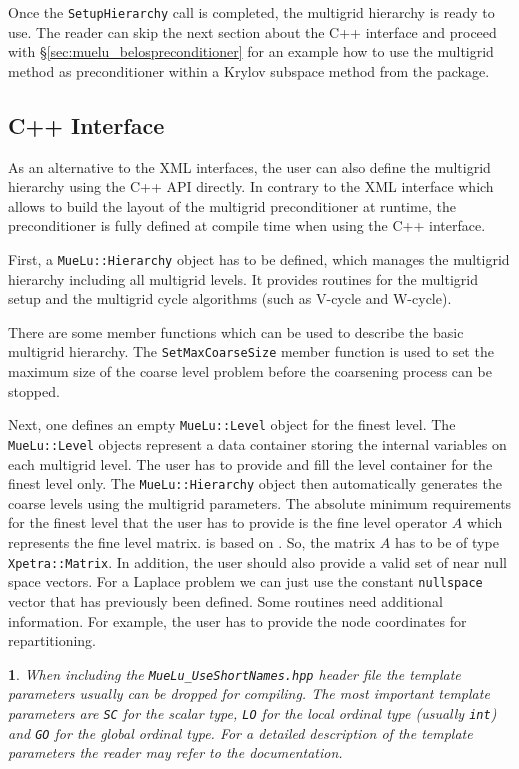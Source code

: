 \documentclass[10pt,fleqn]{book}
\newtheorem*{mycomment}{\ding{42}}
\providecommand\printCppListing[1]{

}
\begin{document}
Once the \texttt{SetupHierarchy} call is completed, the multigrid hierarchy is ready to use. The reader can skip the next section about the C++ interface and proceed with \S\ref{sec:muelu_belospreconditioner} for an example how to use the multigrid method as preconditioner within a Krylov subspace method from the \belos package.

\subsection{C++ Interface}

As an alternative to the XML interfaces, the user can also define the multigrid hierarchy using the C++ API directly. In contrary to the XML interface which allows to build the layout of the multigrid preconditioner at runtime, the preconditioner is fully defined at compile time when using the C++ interface.

First, a \texttt{MueLu::Hierarchy} object has to be defined, which manages the multigrid hierarchy including all multigrid levels. It provides routines for the multigrid setup and the multigrid cycle algorithms (such as V-cycle and W-cycle).
\printCppListing{ScalingTest.cpp_6.fragment}

There are some member functions which can be used to describe the basic multigrid hierarchy. The \texttt{SetMaxCoarseSize} member function is used to set the maximum size of the coarse level problem before the coarsening process can be stopped.
\printCppListing{ScalingTest.cpp_8.fragment}

Next, one defines an empty \texttt{MueLu::Level} object for the finest level. The \texttt{MueLu::Level} objects represent a data container storing the internal variables on each multigrid level. The user has to provide and fill the level container for the finest level only. The \texttt{MueLu::Hierarchy} object then automatically generates the coarse levels using the multigrid parameters. The absolute minimum requirements for the finest level that the user has to provide is the fine level operator $A$ which represents the fine level matrix. \muelu is based on \xpetra. So, the matrix $A$ has to be of type \texttt{Xpetra::Matrix}. In addition, the user should also provide a valid set of near null space vectors. For a Laplace problem we can just use the constant \texttt{nullspace} vector that has previously been defined. Some routines need additional information. For example, the user has to provide the node coordinates for repartitioning.
\printCppListing{ScalingTest.cpp_10.fragment}
\begin{mycomment}
When including the \texttt{MueLu\_UseShortNames.hpp} header file the template parameters usually can be dropped for compiling. The most important template parameters are \texttt{SC} for the scalar type, \texttt{LO} for the local ordinal type (usually \texttt{int}) and \texttt{GO} for the global ordinal type. For a detailed description of the template parameters the reader may refer to the \tpetra documentation.
\end{mycomment}
\end{document}
